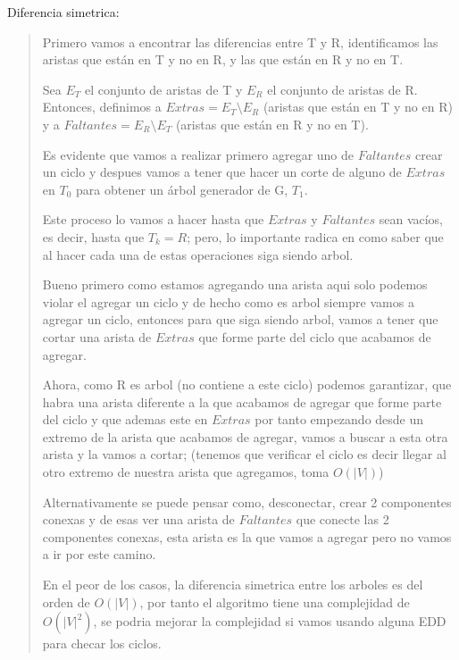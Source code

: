 \textcolor{bibi}{Diferencia simetrica:} \vspace{.2cm}
\begin{quote}
    Primero vamos a encontrar las diferencias entre T y R, identificamos las aristas que est\'an en T y no en R, y las que est\'an en R y no en T. \vspace{.2cm}

    Sea $E_T$ el conjunto de aristas de T y $E_R$ el conjunto de aristas de R. Entonces, definimos a $Extras=E_T \setminus E_R$ (aristas que est\'an en T y no en R) y a $Faltantes=E_R \setminus E_T$ (aristas que est\'an en R y no en T). \vspace{.2cm}

    Es evidente que vamos a realizar primero agregar uno de $Faltantes$ crear un ciclo y despues vamos a tener que hacer un corte de alguno de $Extras$ en $T_{0}$ para obtener un \'arbol generador de G, $T_1$. \vspace{.2cm}

    Este proceso lo vamos a hacer hasta que $Extras$ y $Faltantes$ sean vac\'ios, es decir, hasta que $T_k = R$; pero, lo importante radica en como saber que al hacer cada una de estas operaciones siga siendo arbol. \vspace{.2cm}

    Bueno primero como estamos agregando una arista aqui solo podemos violar el agregar un ciclo y de hecho como es arbol siempre vamos a agregar un ciclo, entonces para que siga siendo arbol, vamos a tener que cortar una arista de $Extras$ que forme parte del ciclo que acabamos de agregar. \vspace{.2cm}

    Ahora, como R es arbol (no contiene a este ciclo) podemos garantizar, que habra una arista diferente a la que acabamos de agregar que forme parte del ciclo y que ademas este en $Extras$ por tanto empezando desde un extremo de la arista que acabamos de agregar, vamos a buscar a esta otra arista y la vamos a cortar; (tenemos que verificar el ciclo es decir llegar al otro extremo de nuestra arista que agregamos, toma $O(|V|)$)\vspace{.2cm}

    Alternativamente se puede pensar como, desconectar, crear 2 componentes conexas y de esas ver una arista de $Faltantes$ que conecte las 2 componentes conexas, esta arista es la que vamos a agregar pero no vamos a ir por este camino.\vspace{.2cm}

    En el peor de los casos, la diferencia simetrica entre los arboles es del orden de $O(|V|)$, por tanto el algoritmo tiene una complejidad de $O(|V|^2)$, se podria mejorar la complejidad si vamos usando alguna EDD para checar los ciclos. \vspace{.2cm}


\end{quote}
